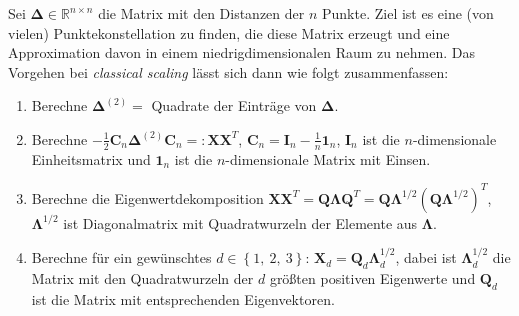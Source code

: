 Sei $\mathbf{\Delta} \in \mathbb{R}^{n\times n}$ die Matrix mit den Distanzen der $n$ Punkte. Ziel ist es eine (von vielen) 
Punktekonstellation zu finden, die diese Matrix erzeugt und eine Approximation davon in einem niedrigdimensionalen Raum zu nehmen.
Das Vorgehen bei \textit{classical scaling} lässt sich dann wie folgt zusammenfassen:
\begin{enumerate}
 \item Berechne $\mathbf{\Delta}^{(2)}=$ Quadrate der Einträge von $\mathbf{\Delta}$.
 \item Berechne $-\tfrac{1}{2}\mathbf{C}_n\mathbf{\Delta}^{(2)}\mathbf{C}_n =: \mathbf{XX}^T$, $\mathbf{C}_n=\mathbf{I}_n-\tfrac{1}{n}\mathbf{1}_n$, 
 $\mathbf{I}_n$ ist die $n$-dimensionale Einheitsmatrix und $\mathbf{1}_n$
 ist die $n$-dimensionale Matrix mit Einsen.
 \item Berechne die Eigenwertdekomposition $\mathbf{XX}^T = \mathbf{Q\Lambda Q}^T = \mathbf{Q\Lambda}^{1/2}(\mathbf{Q\Lambda}^{1/2})^T$, 
 $\mathbf{\Lambda}^{1/2}$ ist Diagonalmatrix mit Quadratwurzeln der Elemente aus $\mathbf{\Lambda}$.
 \item Berechne für ein gewünschtes $d\in \left\lbrace 1,\ 2,\ 3 \right\rbrace$: 
 $\mathbf{X}_d= \mathbf{Q}_d\mathbf{\Lambda}^{1/2}_d$, dabei ist
 $\mathbf{\Lambda}^{1/2}_d$ die Matrix mit den Quadratwurzeln der $d$ größten positiven Eigenwerte und $\mathbf{Q}_d$ ist die Matrix mit 
 entsprechenden Eigenvektoren.
\end{enumerate}


